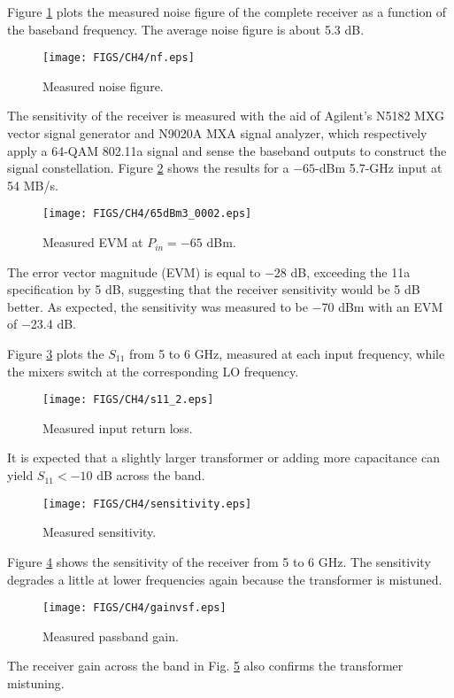 Figure \ref{fig:nf} plots the measured noise figure of the complete receiver as a function of the baseband frequency. The average noise figure is about
5.3 dB.
\begin{figure}[htb!]
\centering
\texttt{[image: FIGS/CH4/nf.eps]}
\caption{Measured noise figure.}
\label{fig:nf}
\end{figure}
The sensitivity of the receiver is measured with the aid of Agilent's N5182 MXG vector signal generator and N9020A MXA signal analyzer, which
respectively apply a 64-QAM 802.11a signal and sense the baseband outputs to construct the signal constellation. Figure \ref{fig:constel} shows the
results for a $-65$-dBm 5.7-GHz input at 54 MB/s.
\begin{figure}[htb!]
\centering
\texttt{[image: FIGS/CH4/65dBm3\_0002.eps]}
\caption{Measured EVM at $P_{in}=-65$ dBm.}
\label{fig:constel}
\end{figure}
The error vector magnitude (EVM) is equal to $-28$ dB, exceeding the 11a specification by 5 dB, suggesting that the receiver sensitivity would be 5 dB
better. As expected, the sensitivity was measured to be $-$70 dBm with an EVM of $-$23.4 dB.

Figure \ref{fig:s11} plots the $S_{11}$ from 5 to 6 GHz, measured at each input frequency, while the mixers switch at the corresponding LO frequency.
\begin{figure}[htb!]
\centering
\texttt{[image: FIGS/CH4/s11\_2.eps]}
\caption{Measured input return loss.}
\label{fig:s11}
\end{figure}
It is expected that a slightly larger transformer or adding more capacitance can yield $S_{11}<-10$ dB across the band.
\begin{figure}[htb!]
\centering
\texttt{[image: FIGS/CH4/sensitivity.eps]}
\caption{Measured sensitivity.}
\label{fig:sensitivity}
\end{figure}
Figure \ref{fig:sensitivity} shows the sensitivity of the receiver from 5 to 6 GHz. The sensitivity degrades a little at lower frequencies again because the
transformer is mistuned. 
\begin{figure}[htb!]
\centering
\texttt{[image: FIGS/CH4/gainvsf.eps]}
\caption{Measured passband gain.}
\label{fig:gainvsf}
\end{figure}
The receiver gain across the band in Fig. \ref{fig:gainvsf} also confirms the transformer mistuning.

